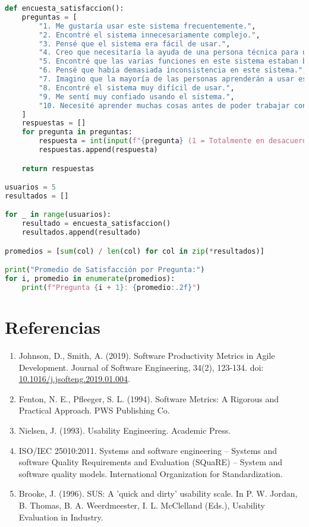 \documentclass{article}
\begin{document}
\begin{lstlisting}[language=Python]
def encuesta_satisfaccion():
    preguntas = [
        "1. Me gustaría usar este sistema frecuentemente.",
        "2. Encontré el sistema innecesariamente complejo.",
        "3. Pensé que el sistema era fácil de usar.",
        "4. Creo que necesitaría la ayuda de una persona técnica para usar este sistema.",
        "5. Encontré que las varias funciones en este sistema estaban bien integradas.",
        "6. Pensé que había demasiada inconsistencia en este sistema.",
        "7. Imagino que la mayoría de las personas aprenderán a usar este sistema muy rápidamente.",
        "8. Encontré el sistema muy difícil de usar.",
        "9. Me sentí muy confiado usando el sistema.",
        "10. Necesité aprender muchas cosas antes de poder trabajar con este sistema."
    ]
    respuestas = []
    for pregunta in preguntas:
        respuesta = int(input(f"{pregunta} (1 = Totalmente en desacuerdo, 5 = Totalmente de acuerdo): "))
        respuestas.append(respuesta)

    return respuestas

usuarios = 5
resultados = []

for _ in range(usuarios):
    resultado = encuesta_satisfaccion()
    resultados.append(resultado)

promedios = [sum(col) / len(col) for col in zip(*resultados)]

print("Promedio de Satisfacción por Pregunta:")
for i, promedio in enumerate(promedios):
    print(f"Pregunta {i + 1}: {promedio:.2f}")
\end{lstlisting}

\section{Referencias}

\begin{enumerate}
    \item Johnson, D., Smith, A. (2019). Software Productivity Metrics in Agile Development. Journal of Software Engineering, 34(2), 123-134. doi: \url{10.1016/j.jsofteng.2019.01.004}.
    \item Fenton, N. E., Pfleeger, S. L. (1994). Software Metrics: A Rigorous and Practical Approach. PWS Publishing Co.
    \item Nielsen, J. (1993). Usability Engineering. Academic Press.
    \item ISO/IEC 25010:2011. Systems and software engineering – Systems and software Quality Requirements and Evaluation (SQuaRE) – System and software quality models. International Organization for Standardization.
    \item Brooke, J. (1996). SUS: A ’quick and dirty’ usability scale. In P. W. Jordan, B. Thomas, B. A. Weerdmeester, I. L. McClelland (Eds.), Usability Evaluation in Industry.
\end{enumerate}
\end{document}

